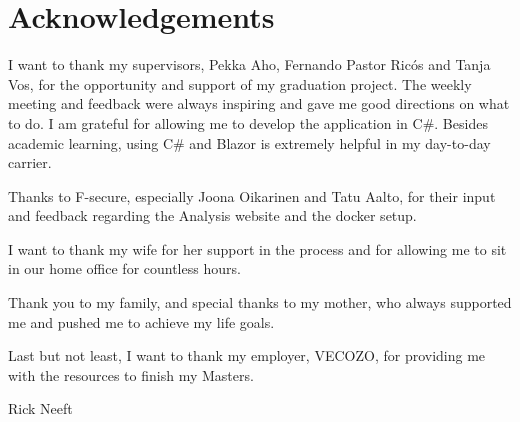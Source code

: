 \chapter*{Acknowledgements}

I want to thank my supervisors, Pekka Aho, Fernando Pastor Ricós and Tanja Vos, for the opportunity and support of my graduation project. The weekly meeting and feedback were always inspiring and gave me good directions on what to do. I am grateful for allowing me to develop the application in C\#. Besides academic learning, using C\# and Blazor is extremely helpful in my day-to-day carrier.

Thanks to F-secure, especially Joona Oikarinen and Tatu Aalto, for their input and feedback regarding the Analysis website and the docker setup.

I want to thank my wife for her support in the process and for allowing me to sit in our home office for countless hours. 

Thank you to my family, and special thanks to my mother, who always supported me and pushed me to achieve my life goals. 

Last but not least, I want to thank my employer, VECOZO, for providing me with the resources to finish my Masters. 

Rick Neeft\\
\myPresentationDate